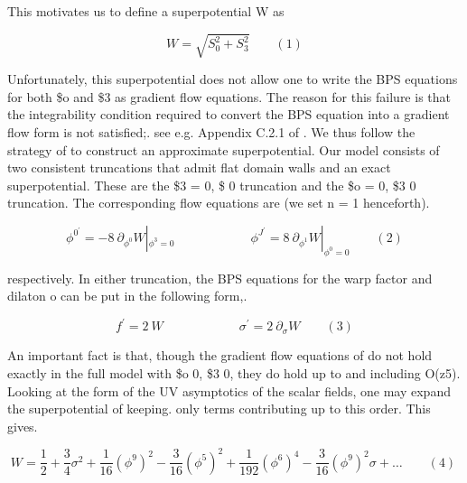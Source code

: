\documentclass{article}
\begin{document}
\sloppy

This motivates us to define a superpotential W as


\begin{equation}
W = \sqrt { S _ { 0 } ^ { 2 } + S _ { 3 } ^ { 2 } } \qquad ( 1 )
\end{equation}


Unfortunately, this superpotential does not allow one to write the BPS equations for both
\$o and \$3 as gradient flow equations. The reason for this failure is that the integrability
condition required to convert the BPS equation into a gradient flow form is not satisfied;.
see e.g. Appendix C.2.1 of . We thus follow the strategy of to construct an approximate
superpotential. Our model consists of two consistent truncations that admit flat domain walls
and an exact superpotential. These are the \$3 = 0, \$  0 truncation and the \$o = 0, \$3  0
truncation. The corresponding flow equations are (we set n = 1 henceforth).


\begin{equation}
\phi ^ { 0 ^ { \prime } } = - 8 ~ \partial _ { \phi ^ { 0 } } W | _ { \phi ^ { 3 } = 0 } \qquad \qquad \qquad \phi ^ { J ^ { \prime } } = 8 ~ \partial _ { \phi ^ { 1 } } W | _ { \phi ^ { 0 } = 0 } \qquad ( 2 )
\end{equation}


respectively. In either truncation, the BPS equations for the warp factor and dilaton o can
be put in the following form,.


\begin{equation}
f ^ { \prime } = 2 ~ W \qquad \qquad \qquad \sigma ^ { \prime } = 2 ~ \partial _ { \sigma } W \qquad ( 3 )
\end{equation}


An important fact is that, though the gradient flow equations of do not hold exactly in the
full model with \$o  0, \$3  0, they do hold up to and including O(z5). Looking at the form
of the UV asymptotics of the scalar fields, one may expand the superpotential of keeping.
only terms contributing up to this order. This gives.


\begin{equation}
W = { \frac { 1 } { 2 } } + { \frac { 3 } { 4 } } \sigma ^ { 2 } + { \frac { 1 } { 1 6 } } ( \phi ^ { 9 } ) ^ { 2 } - { \frac { 3 } { 1 6 } } ( \phi ^ { 5 } ) ^ { 2 } + { \frac { 1 } { 1 9 2 } } ( \phi ^ { 6 } ) ^ { 4 } - { \frac { 3 } { 1 6 } } ( \phi ^ { 9 } ) ^ { 2 } \sigma + \dots \qquad ( 4 ) ~
\end{equation}
\end{document}
